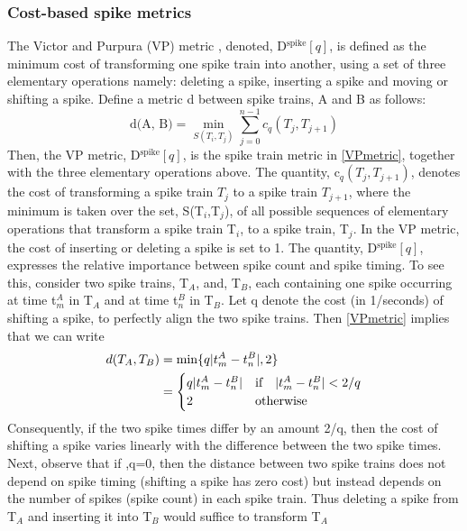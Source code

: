 \subsubsection{Cost-based spike metrics}
The Victor and Purpura (VP) metric \cite{Victor1996, Victor1998}, denoted, 
D$^{\text{spike}}[q]$, is defined as the minimum cost of transforming one spike
train into another, using a set of three elementary operations namely:
deleting a spike, inserting a spike and moving or shifting a spike. Define a metric d between spike trains, A and B as follows:
\begin{equation}\label{VPmetric}
\text{d(A, B)} = \displaystyle \min_{S(T_{i}, T_{j})} \sum_{j=0}^{n-1} c_{q}(T_{j}, T_{j+1}) 
\end{equation} 
Then, the VP metric, D$^{\text{spike}}[q]$, is the spike train metric in \eqref{VPmetric}, together with the three elementary operations above.
The quantity, c$_{q}(T_{j}, T_{j+1})$, denotes the cost of transforming a spike train $T_{j}$ to a spike train $T_{j+1}$, where the minimum is taken over the set, S(T$_{i}$,T$_{j}$), of all possible sequences of elementary operations that transform a spike train T$_{i}$, to a spike train, T$_{j}$.
In the VP metric, the cost of inserting or deleting a spike is set to 1.
The quantity, D$^{\text{spike}}[q]$, expresses the relative importance between
spike count and spike timing.
To see this, consider two spike trains, T$_{A}$, and, T$_{B}$, each containing 
one spike occurring at time t$_{m}^{A}$ in T$_{A}$ and at time t$_{n}^{B}$ in T$_{B}$. Let q denote the cost (in 1/seconds) of shifting a spike, to perfectly align the two spike trains.
Then \eqref{VPmetric} implies that we can write 
\begin{align*}
d(T_{A}, T_{B}) &= \displaystyle \min \{ q\lvert t_{m}^{A} - t_{n}^{B}\rvert,  2 \}\\
  &= \begin{cases} 
       q\lvert t_{m}^{A} - t_{n}^{B}\rvert & \text{if} \quad  \lvert t_{m}^{A} - t_{n}^{B}\rvert < 2/q \\
2 & \text{otherwise}        
\end{cases}
\end{align*}
Consequently, if the two spike times differ by an amount 2/q, then the cost of shifting a spike varies linearly with the difference between the two spike times.
Next, observe that if ,q=0, then the distance between two spike trains does not depend on spike timing (shifting a spike has zero cost) but instead depends on the number of spikes (spike count) in each spike train. Thus deleting a spike from T$_{A}$ and inserting it into T$_{B}$ would suffice to transform T$_{A}$
